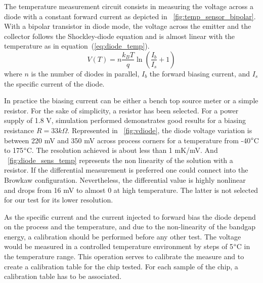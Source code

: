 The temperature measurement circuit consists in measuring the voltage across a diode with a constant forward current as depicted in \figurename~\ref{fig:temp_sensor_bipolar}. With a bipolar transistor in diode mode, the voltage across the emitter and the collector follows the Shockley-diode equation and is almost linear with the temperature as in equation~(\ref{eq:diode_temp}).
\begin{equation}
    \label{eq:diode_temp}
    V(T) = n \frac{k_BT}{q}\ln\left(\frac{I_b}{I_s}+1 \right)
\end{equation}
where $n$ is the number of diodes in parallel, $I_b$ the forward biasing current, and $I_s$ the specific current of the diode.

In practice the biasing current can be either a bench top source meter or a simple resistor. For the sake of simplicity, a resistor has been selected. For a power supply of 1.8 V, simulation performed demonstrates good results for a biasing resistance $R = 33 k\Omega$. Represented in \figurename~\ref{fig:vdiode}, the diode voltage variation is between 220 mV and 350 mV across process corners for a temperature from -40\(\degree\)C to 175\(\degree\)C. The resolution achieved is about less than 1 mK/mV. And \figurename~\ref{fig:diode_sens_temp} represents the non linearity of the solution with a resistor. If the differential measurement is preferred one could connect into the Browkaw configuration. Nevertheless, the differential value is highly nonlinear and drops from 16 mV to almost 0 at high temperature. The latter is not selected for our test for its lower resolution.

As the specific current and the current injected to forward bias the diode depend on the process and the temperature, and due to the non-linearity of the bandgap energy, a calibration should be performed before any other test. The voltage would be measured in a controlled temperature environment by steps of 5\(\degree\)C in the temperature range. This operation serves to calibrate the measure and to create a calibration table for the chip tested. For each sample of the chip, a calibration table has to be associated.

